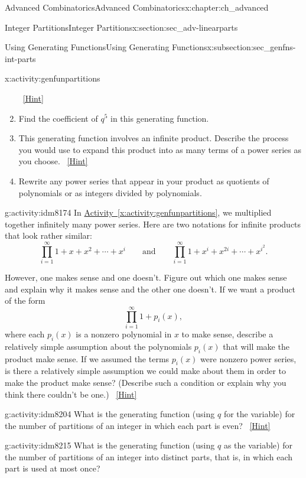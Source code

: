 \documentclass[oneside,10pt,]{book}
\numberwithin{equation}{chapter}
\begin{document}
\begin{chapterptx}{Advanced Combinatorics}{}{Advanced Combinatorics}{}{}{x:chapter:ch_advanced}
\begin{sectionptx}{Integer Partitions}{}{Integer Partitions}{}{}{x:section:sec_adv-linearparts}
\begin{subsectionptx}{Using Generating Functions}{}{Using Generating Functions}{}{}{x:subsection:sec_genfns-int-parts}
\begin{activity}{}{x:activity:genfunpartitions}
\begin{enumerate}[font=\bfseries,label=(\alph*),ref=\alph*]
\qquad~\hfill{\tiny\hyperlink{g:hint:idm8121-back}{[Hint]}}\item{}Find the coefficient of \(q^5\) in this generating function.%
\item{}This generating function involves an infinite product. Describe the process you would use to expand this product into as many terms of a power series as you choose.%
\qquad~\hfill{\tiny\hyperlink{g:hint:idm8159-back}{[Hint]}}\item{}Rewrite any power series that appear in your product as quotients of polynomials or as integers divided by polynomials.%
\end{enumerate}
\end{activity}
\begin{activity}{}{g:activity:idm8174}%
In \hyperref[x:activity:genfunpartitions]{Activity~\ref{x:activity:genfunpartitions}}, we multiplied together infinitely many power series. Here are two notations for infinite products that look rather similar:%
\begin{equation*}
\prod_{i=1}^\infty 1 + x + x^2 +\cdots+ x^i\qquad\mbox{and}\qquad
\prod_{i=1}^\infty 1 +x^i +x^{2i} +\cdots + x^{i^2}.
\end{equation*}
%
\par
However, one makes sense and one doesn't. Figure out which one makes sense and explain why it makes sense and the other one doesn't. If we want a product of the form%
\begin{equation*}
\prod_{i=1}^\infty 1 +p_i(x),
\end{equation*}
where each \(p_i(x)\) is a nonzero polynomial in \(x\) to make sense, describe a relatively simple assumption about the polynomials \(p_i(x)\) that will make the product make sense. If we assumed the terms \(p_i(x)\) were nonzero power series, is there a relatively simple assumption we could make about them in order to make the product make sense? (Describe such a condition or explain why you think there couldn't be one.)%
\qquad~\hfill{\tiny\hyperlink{g:hint:idm8185-back}{[Hint]}}\end{activity}
\begin{activity}{}{g:activity:idm8204}%
What is the generating function (using \(q\) for the variable) for the number of partitions of an integer in which each part is even?%
\qquad~\hfill{\tiny\hyperlink{g:hint:idm8208-back}{[Hint]}}\end{activity}
\begin{activity}{}{g:activity:idm8215}%
What is the generating function (using \(q\) as the variable) for the number of partitions of an integer into distinct parts, that is, in which each part is used at most once?%

\end{activity}
\end{subsectionptx}
\end{sectionptx}
\end{chapterptx}
\end{document}
